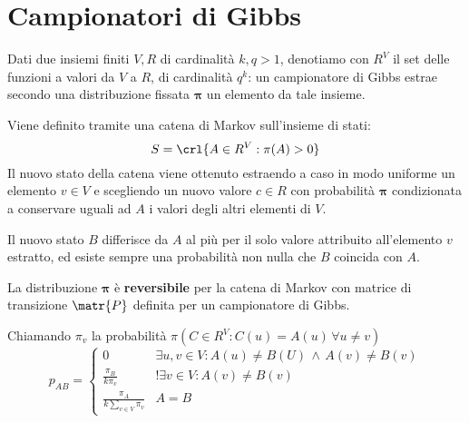 \documentclass[\main/main.tex]{subfiles}
\begin{document}
\section{Campionatori di Gibbs}
Dati due insiemi finiti \(V, R\) di cardinalità \(k, q > 1\), denotiamo con \(R^V\) il set delle funzioni a valori da \(V\) a \(R\), di cardinalità \(q^k\): un campionatore di Gibbs estrae secondo una distribuzione fissata \(\bm{\pi} \) un elemento da tale insieme.

Viene definito tramite una catena di Markov sull'insieme di stati:
\[
  S = \crl{A \in R^V: \pi(A) > 0}
\]
Il nuovo stato della catena viene ottenuto estraendo a caso in modo uniforme un elemento \(v \in V\) e scegliendo un nuovo valore \(c \in R\) con probabilità \(\bm{\pi} \) condizionata a conservare uguali ad \(A\) i valori degli altri elementi di \(V\).

Il nuovo stato \(B\) differisce da \(A\) al più per il solo valore attribuito all'elemento \(v\) estratto, ed esiste sempre una probabilità non nulla che \(B\) coincida con \(A\).

\begin{theorem}
  La distribuzione \(\bm{\pi} \) è \textbf{reversibile} per la catena di Markov con matrice di transizione \(\matr{P}\) definita per un campionatore di Gibbs.

  Chiamando \(\pi_v\) la probabilità \(\pi(C \in R^V: C(u) = A(u) \, \forall u \neq v)\)
  \[
    p_{AB} = \begin{cases}
      0                                  & \exists u, v \in V: A(u) \neq B(U) \, \land \, A(v) \neq B(v) \\
      \frac{\pi_B}{k\pi_v}               & !\exists v \in V: A(v) \neq B(v)                              \\
      \frac{\pi_A}{k\sum_{v \in V}\pi_v} & A = B
    \end{cases}
  \]
\end{theorem}
\end{document}
